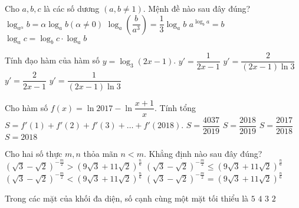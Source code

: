 \begin{ex}%
	Cho $a,b,c$ là các số dương $(a,b\neq 1)$. Mệnh đề nào sau đây đúng?
	\choice 
	{$\log_{a^{\alpha}}{b}=\alpha\log_{a}{b} (\alpha \neq 0)$}
	{$\log_{a}\left(\dfrac{b}{a^3}\right)=\dfrac{1}{3}\log_{a}{b}$}
	{$a^{\log_{b}{a}}=b$}
	{\True $\log_{a}{c}=\log_{b}{c}\cdot \log_{a}{b}$}
\end{ex}
\begin{ex}%
	Tính đạo hàm của hàm số $y=\log_{3}{(2x-1)}$.
	\choice 
	{$y'=\dfrac{1}{2x-1}$}
	{\True $y'=\dfrac{2}{(2x-1)\ln{3} }$}
	{$y'=\dfrac{2}{2x-1}$}
	{$y'=\dfrac{1}{(2x-1)\ln{3}}$}
\end{ex}
\begin{ex}%
	Cho hàm số $f(x)=\ln{2017}-\ln{\dfrac{x+1}{x}}$. Tính tổng $S=f'(1)+f'(2)+f'(3)+\ldots +f'(2018)$.
	\choice 
	{$S=\dfrac{4037}{2019}$}
	{\True $S=\dfrac{2018}{2019}$}
	{ $S=\dfrac{2017}{2018}$}
	{$S=2018$}
\end{ex}
\begin{ex}%
	Cho hai số thực $m,n$ thỏa mãn $n<m$. Khẳng định nào sau đây đúng?
	\choice 
	{$\left(\sqrt{3}-\sqrt{2}\right)^{-\tfrac{m}{2}}>\left(9\sqrt{3}+11\sqrt{2}\right)^{\tfrac{n}{6}}$}
	{$\left(\sqrt{3}-\sqrt{2}\right)^{-\tfrac{m}{2}}\leq \left(9\sqrt{3}+11\sqrt{2}\right)^{\tfrac{n}{6}}$}
	{\True $\left(\sqrt{3}-\sqrt{2}\right)^{-\tfrac{m}{2}}<	\left(9\sqrt{3}+11\sqrt{2}\right)^{\tfrac{n}{6}}$}
	{$\left(\sqrt{3}-\sqrt{2}\right)^{-\tfrac{m}{2}}=\left(9\sqrt{3}+11\sqrt{2}\right)^{\tfrac{n}{6}}$}
\end{ex}
\begin{ex}%
	Trong các mặt của khối đa diện, số cạnh cùng một mặt tối thiểu là
	\choice 
	{$5$}
	{$4$}
	{\True $3$}
	{$2$}
\end{ex}
